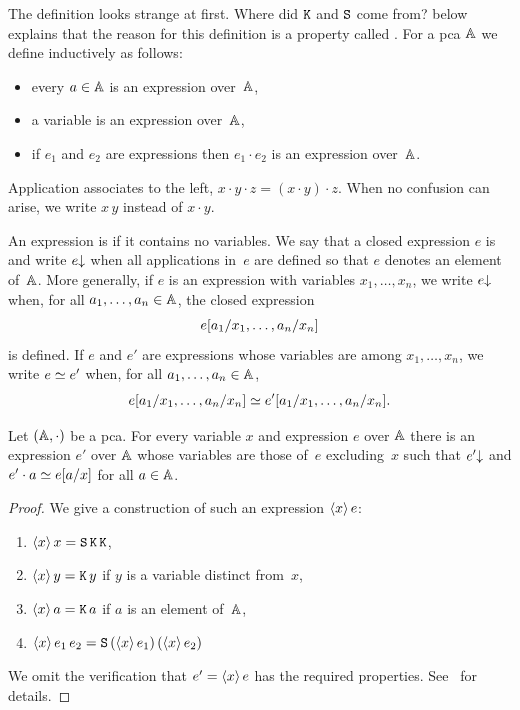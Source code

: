 \noindent
The definition looks strange at first. Where did $\combK$ and $\combS$
come from?  below explains
that the reason for this definition is a property called
.
%
For a pca $\AA$ we define  inductively as
follows:
%
\begin{itemize}
\item every $a \in \AA$ is an expression over~$\AA$,
\item a variable is an expression over~$\AA$,
\item if $e_1$ and $e_2$ are expressions then $e_1 \cdot e_2$ is an
  expression over~$\AA$.
\end{itemize}
%
Application associates to the left, $x \cdot y \cdot z = (x \cdot y) \cdot z$.
When no confusion can arise, we write $x \, y$ instead of $x \cdot y$.

An expression is  if it contains no variables. We say
that a closed expression $e$ is  and write $\defined{e}$
when all applications in~$e$ are defined so that $e$ denotes an
element of~$\AA$. More generally, if $e$ is an expression with variables
$x_1, \ldots, x_n$, we write $\defined{e}$ when, for all $a_1, \ldots,
a_n \in \AA$, the closed expression
%
\begin{equation*}
  \subst{e}{a_1/x_1, \ldots, a_n/x_n}
\end{equation*}
%
is defined. If $e$ and $e'$ are expressions whose variables are among
$x_1, \ldots, x_n$, we write $e \kleq e'$ when, for all $a_1, \ldots,
a_n \in \AA$,
%
\begin{equation*}
  \subst{e}{a_1/x_1, \ldots, a_n/x_n} \kleq
  \subst{e'}{a_1/x_1, \ldots, a_n/x_n}.
\end{equation*}

\begin{theorem}
  \label{th:combinatory-completeness}
  Let $(\AA, {\cdot})$ be a pca. For every variable $x$ and expression
  $e$ over $\AA$ there is an expression $e'$ over $\AA$ whose variables
  are those of~$e$ excluding~$x$ such that $\defined{e'}$ and $e'
  \cdot a \kleq \subst{e}{a/x}$ for all $a \in \AA$.
\end{theorem}

\begin{proof}
  We give a construction of such an expression $\pcalam{x} e$:
  \begin{enumerate}
  \item $\pcalam{x} x = \combS\, \combK\, \combK$,
  \item $\pcalam{x} y = \combK\, y$ if $y$ is a variable distinct from~$x$,
  \item $\pcalam{x} a = \combK\, a$ if $a$ is an element of~$\AA$,
  \item $\pcalam{x}{e_1\, e_2} = \combS\, (\pcalam{x} e_1)\, (\pcalam{x} e_2)$
  \end{enumerate}
  We omit the verification that $e' = \pcalam{x} e$ has the required
  properties. See~ for details.
\end{proof}

